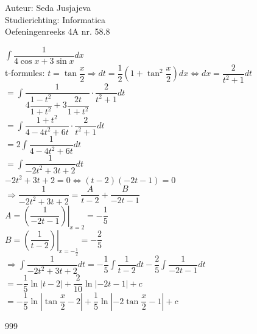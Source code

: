 \documentclass[a4paper]{article}
\newcommand{\integral}{\displaystyle\int}
\begin{document}
\noindent \large Auteur: Seda Jusjajeva\\
\noindent \large Studierichting: Informatica\\
\noindent \large Oefeningenreeks 4A nr. 58.8\\

\medskip

\normalsize

$\integral \dfrac{1}{4\cos x + 3\sin x}dx$ \\

t-formules: $t = \tan \dfrac{x}{2} \Rightarrow dt = \dfrac{1}{2}\left(1 + \tan^2 \dfrac{x}{2}\right)dx \Leftrightarrow dx = \dfrac{2}{t^2 + 1}dt$ \\

$= \integral \dfrac{1}{4\dfrac{1 - t^2}{1 + t^2} + 3\dfrac{2t}{1 + t^2}}\cdot\dfrac{2}{t^2 + 1}dt$ \\

$= \integral \dfrac{1 + t^2}{4 - 4t^2 + 6t}\cdot\dfrac{2}{t^2 + 1}dt$ \\

$= 2\integral \dfrac{1}{4 - 4t^2 + 6t}dt$ \\

$= \integral \dfrac{1}{-2t^2 + 3t + 2}dt$ \\

$-2t^2 + 3t + 2 = 0 \Leftrightarrow (t - 2)(-2t - 1) = 0$ \\

$\Rightarrow\dfrac{1}{-2t^2 + 3t + 2} = \dfrac{A}{t - 2} + \dfrac{B}{-2t - 1}$ \\

$A = \left.\left(\dfrac{1}{-2t - 1}\right)\right|_{x = 2} = -\dfrac{1}{5} $ \\

$B = \left.\left(\dfrac{1}{t - 2}\right)\right|_{x = -\tfrac{1}{2}} = -\dfrac{2}{5} $ \\

$\Rightarrow \integral\dfrac{1}{-2t^2 + 3t + 2}dt = -\dfrac{1}{5}\integral\dfrac{1}{t - 2}dt - \dfrac{2}{5}\integral\dfrac{1}{-2t - 1}dt$ \\

$= -\dfrac{1}{5}\ln |t - 2| + \dfrac{2}{10} \ln |-2t - 1| + c$ \\

$= -\dfrac{1}{5}\ln \left|\tan \dfrac{x}{2} - 2\right| + \dfrac{1}{5} \ln \left|-2\tan \dfrac{x}{2} - 1\right| + c$ \\



\begin{thebibliography}{999}
\end{thebibliography}
\end{document}
